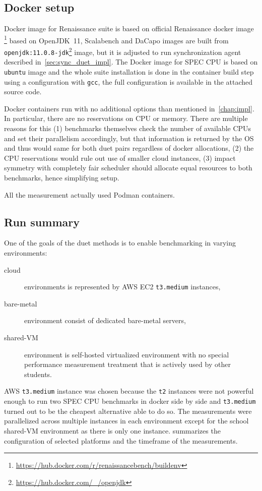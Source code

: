 \subsection{Docker setup}
Docker image for Renaissance suite is based on official Renaissance docker image \footnote{\url{https://hub.docker.com/r/renaissancebench/buildenv}} based on OpenJDK~11, Scalabench and DaCapo images are built from \lstinline{openjdk:11.0.8-jdk}\footnote{\url{https://hub.docker.com/_/openjdk}} image, but it is adjusted to run synchronization agent described in~\cref{sec:sync_duet_impl}.
The Docker image for SPEC CPU is based on \lstinline{ubuntu} image and the whole suite installation is done in the container build step using a configuration with \lstinline{gcc}, the full configuration is available in the attached source code.

Docker containers run with no additional options than mentioned in~\cref{chap:impl}.
In particular, there are no reservations on CPU or memory.
There are multiple reasons for this (1) benchmarks themselves check the number of available CPUs and set their parallelism accordingly, but that information is returned by the OS and thus would same for both duet pairs regardless of docker allocations, (2) the CPU reservations would rule out use of smaller cloud instances, (3) impact symmetry with completely fair scheduler should allocate equal resources to both benchmarks, hence simplifying setup.

All the measurement actually used Podman containers.

\subsection{Run summary}

One of the goals of the duet methods is to enable benchmarking in varying environments:
\begin{description}
	\item[cloud] environments is represented by AWS EC2 \lstinline{t3.medium} instances,
	\item[bare-metal] environment consist of dedicated \mbox{bare-metal} servers,
	\item[shared-VM] environment is \mbox{self-hosted} virtualized environment with no special performance measurement treatment that is actively used by other students.
\end{description}
AWS \lstinline{t3.medium} instance was chosen because the \lstinline{t2} instances were not powerful enough to run two SPEC CPU benchmarks in docker side by side and \lstinline{t3.medium} turned out to be the cheapest alternative able to do so.
The measurements were parallelized across multiple instances in each environment except for the school \mbox{shared-VM} environment as there is only one instance.
 summarizes the configuration of selected platforms and the timeframe of the measurements.

